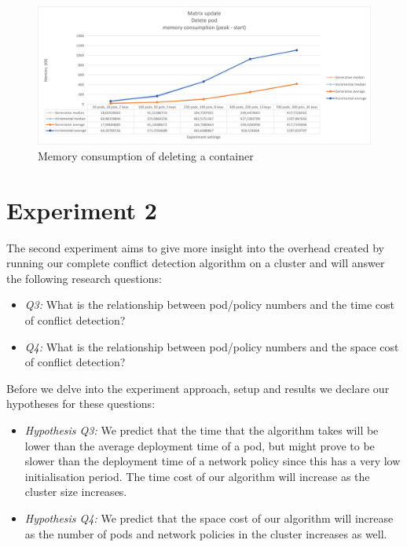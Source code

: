 \begin{figure}[H]
    \centering
    \includegraphics[width=\textwidth]{images/experiment1/delPod-memory.png}
    \caption{Memory consumption of deleting a container}
    \label{fig:exp1-delPod-memory}
\end{figure}



\section{Experiment 2}\label{sec:experiment2}
The second experiment aims to give more insight into the overhead created by running our complete conflict detection algorithm on a cluster and will answer the following research questions:

\begin{itemize}
    \item \textit{Q3:} What is the relationship between pod/policy numbers and the time cost of conflict detection?
    \item \textit{Q4:} What is the relationship between pod/policy numbers and the space cost of conflict detection?
\end{itemize}

Before we delve into the experiment approach, setup and results we declare our hypotheses for these questions:

\begin{itemize}
    \item \textit{Hypothesis Q3:} We predict that the time that the algorithm takes will be lower than the average deployment time of a pod, but might prove to be slower than the deployment time of a network policy since this has a very low initialisation period. The time cost of our algorithm will increase as the cluster size increases.
    \item \textit{Hypothesis Q4:} We predict that the space cost of our algorithm will increase as the number of pods and network policies in the cluster increases as well.
\end{itemize}

